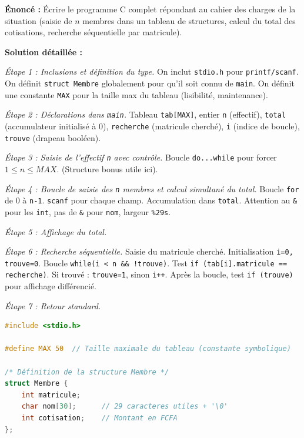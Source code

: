 \documentclass[11pt]{article}
\begin{document}
\begin{exoresolu}
\textbf{Énoncé :} Écrire le programme C complet répondant au cahier des charges de la situation (saisie de $n$ membres dans un tableau de structures, calcul du total des cotisations, recherche séquentielle par matricule).

\textbf{Solution détaillée :}

\emph{Étape 1 : Inclusions et définition du type.}
On inclut \texttt{stdio.h} pour \texttt{printf/scanf}. On définit \texttt{struct Membre} globalement pour qu'il soit connu de \texttt{main}. On définit une constante \texttt{MAX} pour la taille max du tableau (lisibilité, maintenance).

\emph{Étape 2 : Déclarations dans \texttt{main}.}
Tableau \texttt{tab[MAX]}, entier \texttt{n} (effectif), \texttt{total} (accumulateur initialisé à 0), \texttt{recherche} (matricule cherché), \texttt{i} (indice de boucle), \texttt{trouve} (drapeau booléen).

\emph{Étape 3 : Saisie de l'effectif \texttt{n} avec contrôle.}
Boucle \texttt{do...while} pour forcer $1 \le n \le MAX$. (Structure bonus utile ici).

\emph{Étape 4 : Boucle de saisie des \texttt{n} membres et calcul simultané du total.}
Boucle \texttt{for} de 0 à \texttt{n-1}. \texttt{scanf} pour chaque champ. Accumulation dans \texttt{total}. Attention au \texttt{\&} pour les \texttt{int}, pas de \texttt{\&} pour \texttt{nom}, largeur \texttt{\%29s}.

\emph{Étape 5 : Affichage du total.}

\emph{Étape 6 : Recherche séquentielle.}
Saisie du matricule cherché. Initialisation \texttt{i=0, trouve=0}. Boucle \texttt{while(i < n \&\& !trouve)}. Test \texttt{if (tab[i].matricule == recherche)}. Si trouvé : \texttt{trouve=1}, sinon \texttt{i++}. Après la boucle, test \texttt{if (trouve)} pour affichage différencié.

\emph{Étape 7 : Retour standard.}

\tcblower

\begin{lstlisting}[language=C, caption={Code source complet : cooperative-mballa2.c}]
#include <stdio.h>

#define MAX 50  // Taille maximale du tableau (constante symbolique)

/* Définition de la structure Membre */
struct Membre {
    int matricule;
    char nom[30];      // 29 caracteres utiles + '\0'
    int cotisation;    // Montant en FCFA
};


\end{lstlisting}
\end{exoresolu}
\end{document}
